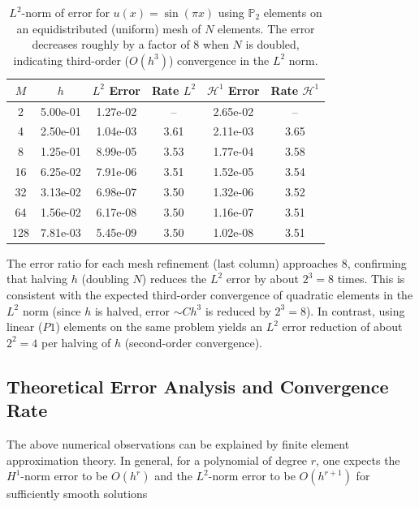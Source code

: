 \documentclass[a4paper,10pt]{article}
\begin{document}
\begin{table}[h]
	\centering
	\begin{tabular}{|c|c|c|c|c|c|}
			\hline
			\(M\) & \(h\) & \(L^2\) Error & Rate \(L^2\) & \(\mathcal{H}^1\) Error & Rate \(\mathcal{H}^1\) \\
			\hline
			2     & 5.00e-01 & 1.27e-02 & -- & 2.65e-02 & -- \\
			4     & 2.50e-01 & 1.04e-03 & 3.61 & 2.11e-03 & 3.65 \\
			8     & 1.25e-01 & 8.99e-05 & 3.53 & 1.77e-04 & 3.58 \\
			16    & 6.25e-02 & 7.91e-06 & 3.51 & 1.52e-05 & 3.54 \\
			32    & 3.13e-02 & 6.98e-07 & 3.50 & 1.32e-06 & 3.52 \\
			64    & 1.56e-02 & 6.17e-08 & 3.50 & 1.16e-07 & 3.51 \\
			128   & 7.81e-03 & 5.45e-09 & 3.50 & 1.02e-08 & 3.51 \\
			\hline
		\end{tabular}
	\caption{\(L^2\)-norm of error for \(u(x)=\sin(\pi x)\) using \(\mathbb{P}_2 \) elements on an equidistributed (uniform) mesh of \(N\) elements. The error decreases roughly by a factor of 8 when \(N\) is doubled, indicating third-order (\(O(h^3)\)) convergence in the \(L^2\) norm.}
	\label{tab:convergence}
\end{table}

The error ratio for each mesh refinement (last column) approaches 8, confirming that halving \(h\) (doubling \(N\)) reduces the \(L^2\) error by about \(2^3=8\) times.
This is consistent with the expected third-order convergence of quadratic elements in the \(L^2\) norm (since \(h\) is halved, error \(\sim Ch^3\) is reduced by \(2^3=8\)).
In contrast, using linear (\(P1\)) elements on the same problem yields an \(L^2\) error reduction of about \(2^2=4\) per halving of \(h\) (second-order convergence).

\subsection{Theoretical Error Analysis and Convergence Rate}

The above numerical observations can be explained by finite element approximation theory.
In general, for a polynomial of degree \(r\), one expects the \(H^1\)-norm error to be \(O(h^r)\) and the \(L^2\)-norm error to be \(O(h^{r+1})\) for sufficiently smooth solutions
\end{document}
